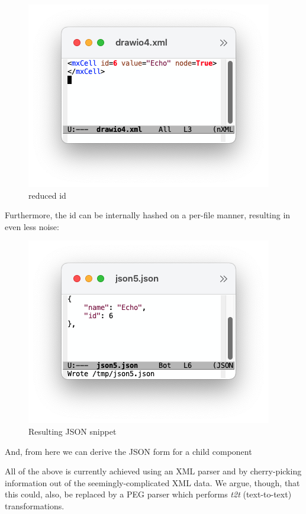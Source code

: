\documentclass[10pt,anonymous,review]{acmart}
\begin{document}
\begin{figure}
    \includegraphics[trim=2cm 2cm 2cm 1.7cm, clip, scale=0.4]{./media/drawio4.png}
    \caption{reduced id}
    \label{drawio4}
\end{figure}
Furthermore, the id can be internally hashed on a per-file manner, resulting in even less noise:


\begin{figure}
    \includegraphics[trim=2cm 2cm 2cm 1.7cm, clip, scale=0.4]{./media/json5.png}
    \caption{Resulting JSON snippet}
    \label{json5}
\end{figure}
And, from here we can derive the JSON form for a child component

\vspace{1\baselineskip}
All of the above is currently achieved using an XML parser and by cherry-picking information out of
the seemingly-complicated XML data. We argue, though, that this could, also, be replaced
by a PEG parser which performs \emph{t2t} (text-to-text) transformations.
\end{document}
